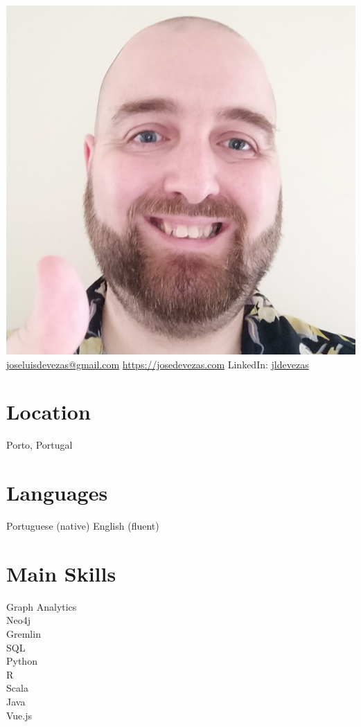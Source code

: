 \documentclass{friggeri-cv}
\begin{document}


\begin{aside} %
\includegraphics[width=\textwidth]{photo.jpg}
%
{\footnotesize \href{mailto:joseluisdevezas@gmail.com}{joseluisdevezas@gmail.com}
\href{https://josedevezas.com}{https://josedevezas.com}
LinkedIn: \href{https://www.linkedin.com/in/jldevezas/?locale=en_US}{jldevezas}}
%
\section{Location}
Porto, Portugal
%
\section{Languages}
Portuguese (native)
English (fluent)
%
\section{Main Skills}
{\small Graph Analytics\\Neo4j\\Gremlin\\SQL\\Python\\R\\Scala\\Java\\Vue.js}
%

\end{aside}
\end{document}
